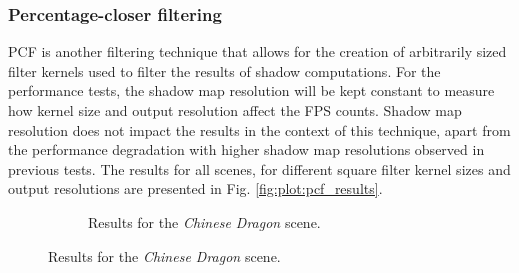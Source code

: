 \subsubsection{Percentage-closer filtering}
PCF is another filtering technique that allows for the creation of arbitrarily sized filter kernels used to filter the results of shadow computations. For the performance tests, the shadow map resolution will be kept constant to measure how kernel size and output resolution affect the FPS counts. Shadow map resolution does not impact the results in the context of this technique, apart from the performance degradation with higher shadow map resolutions observed in previous tests. The results for all scenes, for different square filter kernel sizes and output resolutions are presented in Fig. \ref{fig:plot:pcf_results}.
\begin{figure}[h]
    \centering
    \begin{subfigure}[t]{0.48\textwidth}
        \caption{Results for the \textit{Chinese Dragon} scene.}

\end{subfigure}
\end{figure}
